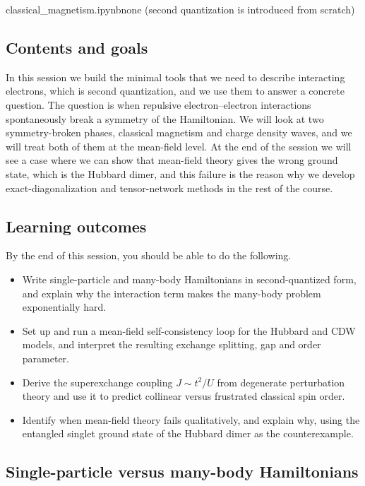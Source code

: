 \documentclass[lecture_notes.tex]{subfiles}
\begin{document}
%
  {classical\_magnetism.ipynb}{none (second quantization is introduced from scratch)}

\subsection*{Contents and goals}
In this session we build the minimal tools that we need to describe interacting electrons, which
is second quantization, and we use them to answer a concrete question. The question is when
repulsive electron--electron interactions spontaneously break a symmetry of the Hamiltonian. We
will look at two symmetry-broken phases, classical magnetism and charge density waves, and we
will treat both of them at the mean-field level. At the end of the session we will see a case
where we can show that mean-field theory gives the wrong ground state, which is the Hubbard
dimer, and this failure is the reason why we develop exact-diagonalization and tensor-network
methods in the rest of the course.

\subsection*{Learning outcomes}
By the end of this session, you should be able to do the following.
\begin{itemize}[nosep]
  \item Write single-particle and many-body Hamiltonians in second-quantized form, and explain
    why the interaction term makes the many-body problem exponentially hard.
  \item Set up and run a mean-field self-consistency loop for the Hubbard and CDW models, and
    interpret the resulting exchange splitting, gap and order parameter.
  \item Derive the superexchange coupling $J\sim t^2/U$ from degenerate perturbation theory and
    use it to predict collinear versus frustrated classical spin order.
  \item Identify when mean-field theory fails qualitatively, and explain why, using the
    entangled singlet ground state of the Hubbard dimer as the counterexample.
\end{itemize}

\subsection{Single-particle versus many-body Hamiltonians}
\end{document}
